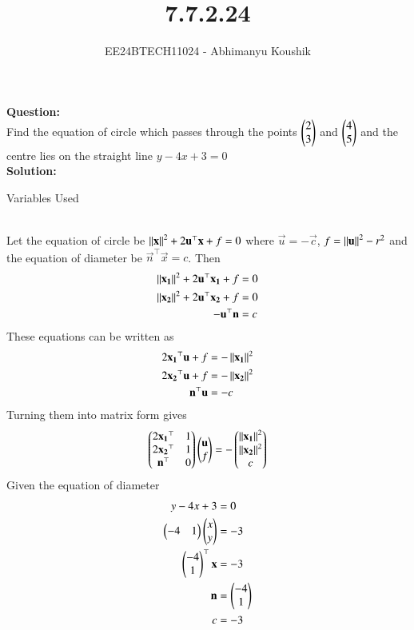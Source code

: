 \documentclass[journal]{IEEEtran}
\begin{document}

\vspace{3cm}

\title{7.7.2.24}
\author{EE24BTECH11024 - Abhimanyu Koushik}
{\let\newpage\relax\maketitle}
\textbf{Question:}\\
Find the equation of circle which passes through the points $\begin{pmatrix}2\\3\end{pmatrix}$ and $\begin{pmatrix}4\\5\end{pmatrix}$ and the centre lies on the straight line $y-4x+3=0$\\
\textbf{Solution:}
\begin{table}[h!]    
  \centering
  
  \caption{Variables Used}
  \label{tab1-1.9-6}
\end{table}\\
Let the equation of circle be $\left\lVert\mathbf{x}\right\rVert^2+2\mathbf{u}^\top\mathbf{x}+f=0$ where $\vec{u}=-\vec{c}$, $f=\left\lVert\mathbf{u}\right\rVert^2-r^2$ and the equation of diameter be $\vec{n}^\top\vec{x}=c$. Then
\begin{align}
\left\lVert\mathbf{x_1}\right\rVert^2+2\mathbf{u}^\top\mathbf{x_1}+f&=0\\
\left\lVert\mathbf{x_2}\right\rVert^2+2\mathbf{u}^\top\mathbf{x_2}+f&=0\\
-\mathbf{u}^\top\mathbf{n}&=c
\end{align}
These equations can be written as 
\begin{align}
2\mathbf{x_1}^\top\mathbf{u}+f&=-\left\lVert\mathbf{x_1}\right\rVert^2\\
2\mathbf{x_2}^\top\mathbf{u}+f&=-\left\lVert\mathbf{x_2}\right\rVert^2\\
\mathbf{n}^\top\mathbf{u}&=-c
\end{align}
Turning them into matrix form gives
\begin{align}
\begin{pmatrix}2\mathbf{x_1}^\top & 1\\2\mathbf{x_2}^\top & 1\\ \mathbf{n}^\top & 0\end{pmatrix}\begin{pmatrix}\mathbf{u}\\f\end{pmatrix}&=-\begin{pmatrix}\left\lVert\mathbf{x_1}\right\rVert^2\\\left\lVert\mathbf{x_2}\right\rVert^2\\c\end{pmatrix}\\
\end{align}
Given the equation of diameter
\begin{align}
y-4x+3&=0\\
\begin{pmatrix}-4 & 1\end{pmatrix}\begin{pmatrix}x\\y\end{pmatrix}&=-3\\
\begin{pmatrix}-4\\1\end{pmatrix}^\top\mathbf{x}&=-3\\
\mathbf{n}&=\begin{pmatrix}-4\\1\end{pmatrix}\\
c&=-3
\end{align}
\end{document}
